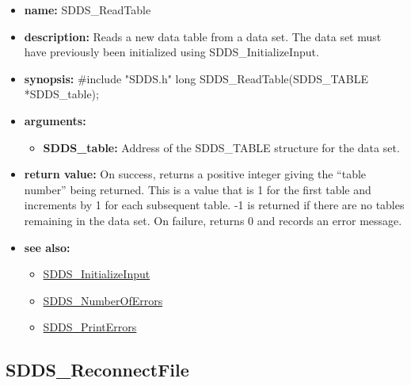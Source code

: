 \documentclass[11pt]{article}
\newcommand{\progref}[1]{\hyperref{SDDS_#1}{{\tt SDDS\_#1} (}{)}{SDDS_#1}}
\begin{document}
\begin{itemize}
\item {\bf name:}\newline
SDDS\_ReadTable
\item {\bf description:}\newline
Reads a new data table from a data set. The data set must have previously been initialized using SDDS\_InitializeInput.
\item {\bf synopsis:} \#include "SDDS.h"\newline
long SDDS\_ReadTable(SDDS\_TABLE *SDDS\_table);
\item {\bf arguments:}
\begin{itemize}
\item {\bf SDDS\_table:} Address of the SDDS\_TABLE structure for the data set.
\end{itemize}
\item {\bf return value:}\newline
On success, returns a positive integer giving the ``table number'' being returned. This is a value that is 1 for the first table and increments by 1 for each subsequent table. -1 is returned if there are no tables remaining in the data set.\newline
\newline
On failure, returns 0 and records an error message. 
\item {\bf see also:}
\begin{itemize}
\item \progref{InitializeInput}
\item \progref{NumberOfErrors}
\item \progref{PrintErrors}
\end{itemize}
\end{itemize}

\subsection{SDDS\_ReconnectFile}
\label{SDDS_ReconnectFile}
\end{document}
